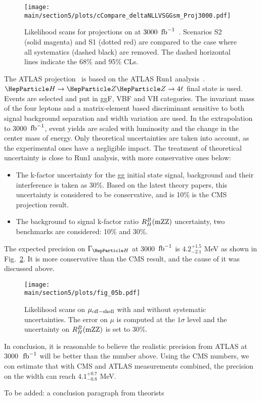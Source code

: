 \begin{figure*}[!htbp]
\centering
\texttt{[image: \\main/section5/plots/cCompare\_deltaNLLVSGGsm\_Proj3000.pdf]}
\caption
{
Likelihood scans for projections on \GH at $3000~\,{\rm fb}^{-1}$~\cite{CMS-PAS-FTR-18-011}. Scenarios S2 (solid magenta) and S1 (dotted red) are compared to the case where all systematics (dashed black) are removed. The dashed horizontal lines indicate the 68\% and 95\% CLs. 
}
\label{fig:GH-projections}
\end{figure*}


The ATLAS projection~\cite{ATL-PHYS-PUB-2015-024} is based on the ATLAS Run1 analysis~\cite{PhysRevD.91.012006}. $\PH\to\PZ\PZ\to4\ell$ final state is used. Events are selected and put in ggF, VBF and VH categories. The invariant mass of the four leptons and a matrix-element based discriminant sensitive to both signal background separation and width variation are used. In the extrapolation to 3000 $\,{\rm fb}^{-1}$, event yields are scaled with luminosity and the change in the center mass of energy. Only theoretical uncertainties are taken into account, as the experimental ones have a negligible impact. The treatment of theoretical uncertainty is close to Run1 analysis, with more conservative ones below: 
\begin{itemize}
	\item {The k-factor uncertainty for the gg initial state signal, background and their interference is taken as 30\%. Based on the latest theory papers, this uncertainty is considered to be conservative, and is 10\% is the CMS projection result.}
	\item {The background to signal k-factor ratio $R^{B}_{H}(\rm{mZZ})$ uncertainty, two benchmarks are considered: 10\% and 30\%. }
\end{itemize}
The expected precision on $\GH$ at 3000 $\,{\rm fb}^{-1}$ is $4.2^{+1.5}_{-2.1}$ MeV as shown in Fig.~\ref{fig:ATLAS_projections}. It is more conservative than the CMS result, and the cause of it was discussed above. 
\begin{figure*}[!htbp]
\centering
\texttt{[image: \\main/section5/plots/fig\_05b.pdf]}
\caption{Likelihood scans on $\mu_{\rm{off-shell}}$ with and without systematic uncertainties. The error on $\mu$ is computed at the $1\sigma$ level and the uncertainty on $R^{B}_{H}(\rm{mZZ})$ is set to 30\%.}
\label{fig:ATLAS_projections}
\end{figure*}

In conclusion, it is reasonable to believe the realistic precision from ATLAS at 3000~$\,{\rm fb}^{-1}$ will be better than the number above. Using the CMS numbers, we con estimate that with CMS and ATLAS measurements combined, the precision on the width can reach $4.1 ^{+0.7}_{-0.8}$ MeV. 

To be added: a conclusion paragraph from theorists
